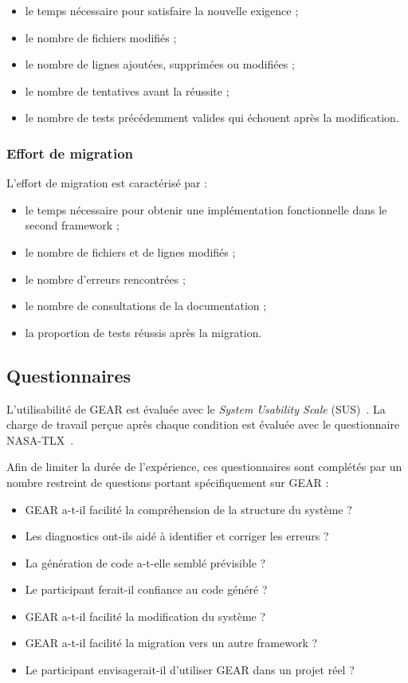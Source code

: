 \begin{itemize}
    \item le temps nécessaire pour satisfaire la nouvelle exigence ;
    \item le nombre de fichiers modifiés ;
    \item le nombre de lignes ajoutées, supprimées ou modifiées ;
    \item le nombre de tentatives avant la réussite ;
    \item le nombre de tests précédemment valides qui échouent après
    la modification.
\end{itemize}


\subsubsection{Effort de migration}

L'effort de migration est caractérisé par :

\begin{itemize}
    \item le temps nécessaire pour obtenir une implémentation
    fonctionnelle dans le second framework ;
    \item le nombre de fichiers et de lignes modifiés ;
    \item le nombre d'erreurs rencontrées ;
    \item le nombre de consultations de la documentation ;
    \item la proportion de tests réussis après la migration.
\end{itemize}


\subsection{Questionnaires}
\label{subsec:questionnaires}

L'utilisabilité de GEAR est évaluée avec le \emph{System Usability
Scale} (SUS)~\cite{brooke1996sus}. La charge de travail perçue après
chaque condition est évaluée avec le questionnaire
NASA-TLX~\cite{hart1988nasa}.

Afin de limiter la durée de l'expérience, ces questionnaires sont
complétés par un nombre restreint de questions portant spécifiquement
sur GEAR :

\begin{itemize}
    \item GEAR a-t-il facilité la compréhension de la structure du
    système ?
    \item Les diagnostics ont-ils aidé à identifier et corriger les
    erreurs ?
    \item La génération de code a-t-elle semblé prévisible ?
    \item Le participant ferait-il confiance au code généré ?
    \item GEAR a-t-il facilité la modification du système ?
    \item GEAR a-t-il facilité la migration vers un autre framework ?
    \item Le participant envisagerait-il d'utiliser GEAR dans un projet
    réel ?
\end{itemize}


